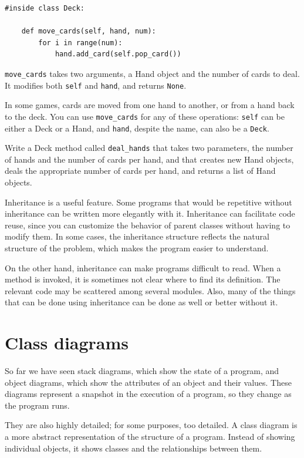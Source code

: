 \documentclass[10pt]{book}
\begin{document}
\begin{verbatim}
#inside class Deck:

    def move_cards(self, hand, num):
        for i in range(num):
            hand.add_card(self.pop_card())
\end{verbatim}
%
\verb"move_cards" takes two arguments, a Hand object and the number of
cards to deal.  It modifies both {\tt self} and {\tt hand}, and
returns {\tt None}.

In some games, cards are moved from one hand to another,
or from a hand back to the deck.  You can use \verb"move_cards"
for any of these operations: {\tt self} can be either a Deck
or a Hand, and {\tt hand}, despite the name, can also be a {\tt Deck}.

\begin{exercise}

Write a Deck method called \verb"deal_hands" that takes two
parameters, the number of hands and the number of cards per
hand, and that creates new Hand objects, deals the appropriate
number of cards per hand, and returns a list of Hand objects.

\end{exercise}

Inheritance is a useful feature.  Some programs that would be
repetitive without inheritance can be written more elegantly
with it.  Inheritance can facilitate code reuse, since you can
customize the behavior of parent classes without having to modify
them.  In some cases, the inheritance structure reflects the natural
structure of the problem, which makes the program easier to
understand.

On the other hand, inheritance can make programs difficult to read.
When a method is invoked, it is sometimes not clear where to find its
definition.  The relevant code may be scattered among several modules.
Also, many of the things that can be done using inheritance can be
done as well or better without it.


\section{Class diagrams}
\label{class.diagram}

So far we have seen stack diagrams, which show the state of
a program, and object diagrams, which show the attributes
of an object and their values.  These diagrams represent a snapshot
in the execution of a program, so they change as the program
runs.

They are also highly detailed; for some purposes, too
detailed.  A class diagram is a more abstract representation
of the structure of a program.  Instead of showing individual
objects, it shows classes and the relationships between them.
\end{document}
